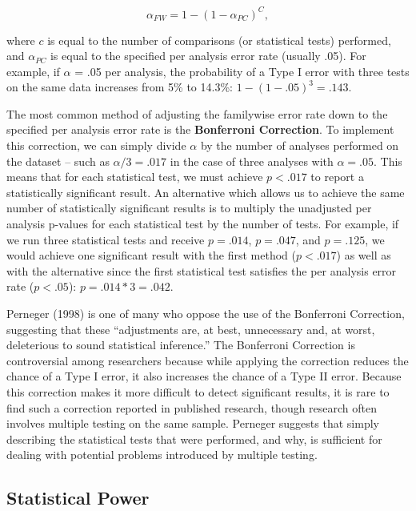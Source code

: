\documentclass[
]{book}
\begin{document}
\[ \alpha_{FW} = 1 - (1 - \alpha_{PC})^C,  \]

where \(c\) is equal to the number of comparisons (or statistical tests) performed, and \(\alpha_{PC}\) is equal to the specified per analysis error rate (usually .05). For example, if \(\alpha\) = .05 per analysis, the probability of a Type I error with three tests on the same data increases from 5\% to 14.3\%: \(1 - (1 - .05)^3 = .143\).

The most common method of adjusting the familywise error rate down to the specified per analysis error rate is the \textbf{Bonferroni Correction}. To implement this correction, we can simply divide \(\alpha\) by the number of analyses performed on the dataset -- such as \(\alpha / 3 = .017\) in the case of three analyses with \(\alpha = .05\). This means that for each statistical test, we must achieve \(p < .017\) to report a statistically significant result. An alternative which allows us to achieve the same number of statistically significant results is to multiply the unadjusted per analysis p-values for each statistical test by the number of tests. For example, if we run three statistical tests and receive \(p = .014\), \(p = .047\), and \(p = .125\), we would achieve one significant result with the first method (\(p < .017\)) as well as with the alternative since the first statistical test satisfies the per analysis error rate (\(p < .05\)): \(p = .014 * 3 = .042\).

Perneger (1998) is one of many who oppose the use of the Bonferroni Correction, suggesting that these ``adjustments are, at best, unnecessary and, at worst, deleterious to sound statistical inference.'' The Bonferroni Correction is controversial among researchers because while applying the correction reduces the chance of a Type I error, it also increases the chance of a Type II error. Because this correction makes it more difficult to detect significant results, it is rare to find such a correction reported in published research, though research often involves multiple testing on the same sample. Perneger suggests that simply describing the statistical tests that were performed, and why, is sufficient for dealing with potential problems introduced by multiple testing.

\hypertarget{statistical-power}{%
\subsection{Statistical Power}\label{statistical-power}}
\end{document}

